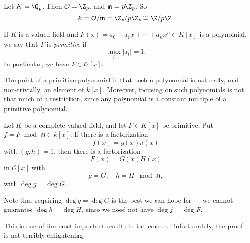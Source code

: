 \documentclass[a4paper]{article}
\begin{document}
\begin{eg}
  Let $K = \Q_p$. Then $\mathcal{O} = \Z_p$, and $\mathfrak{m} = p\Z_p$. So
  \[
    k = \mathcal{O}/\mathfrak{m} = \Z_p/p\Z_p \cong \Z/p\Z.
  \]
\end{eg}

\begin{defi}
  If $K$ is a valued field and $F(x) = a_0 + a_1 x + \cdots + a_n x^n \in K[x]$ is a polynomial, we say that $F$ is \emph{primitive} if
  \[
    \max_i |a_i| = 1.
  \]
  In particular, we have $F \in \mathcal{O}[x]$.
\end{defi}
The point of a primitive polynomial is that such a polynomial is naturally, and non-trivially, an element of $k[x]$. Moreover, focusing on such polynomials is not that much of a restriction, since any polynomial is a constant multiple of a primitive polynomial.

\begin{thm}
  Let $K$ be a complete valued field, and let $F \in K[x]$ be primitive. Put $f = F\bmod \mathfrak{m} \in k[x]$. If there is a factorization
  \[
    f(x) = g(x) h(x)
  \]
  with $(g, h) = 1$, then there is a factorization
  \[
    F(x) = G(x) H(x)
  \]
  in $\mathcal{O}[x]$ with
  \[
    g = G,\quad h = H\mod \mathfrak{m},
  \]
  with $\deg g = \deg G$.
\end{thm}
Note that requiring $\deg g = \deg G$ is the best we can hope for --- we cannot guarantee $\deg h = \deg H$, since we need not have $\deg f = \deg F$.

This is one of the most important results in the course. Unfortunately, the proof is not terribly enlightening.
\end{document}
